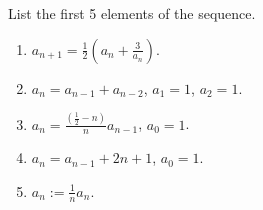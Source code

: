 List the first 5 elements of the sequence. 
\begin{multicols}{2}
\begin{enumerate}
\item $\displaystyle a_{n+1}=\frac{1}{2}\left(a_n+ \frac{3}{a_n}\right)$.
\item $\displaystyle a_n=a_{n-1}+a_{n-2}$, $a_1=1$, $a_2=1$.
\item $\displaystyle a_n= \frac{\left(\frac{1}{2}-n\right)}{n} a_{n-1} $, $a_0=1$.
\item $\displaystyle a_n= a_{n-1}+2n+1$, $a_0=1$.
\item $\displaystyle a_n:=\frac{1}{n} a_n$.
\end{enumerate}
\end{multicols}